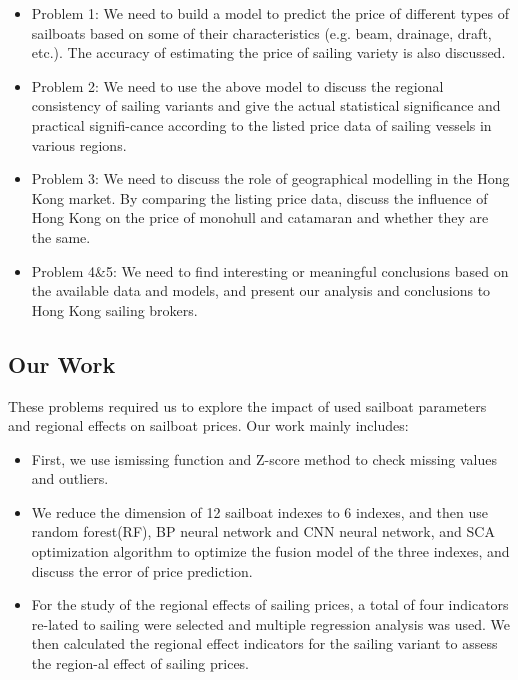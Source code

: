 \begin{itemize}
\setlength{\parsep}{0ex} %
\setlength{\topsep}{2ex} %
\setlength{\itemsep}{1ex} %
\item Problem 1: We need to build a model to predict the price of different types of sailboats based on some of their characteristics (e.g. beam, drainage, draft, etc.). The accuracy of estimating the price of sailing variety is also discussed.
\item Problem 2: We need to use the above model to discuss the regional consistency of sailing variants and give the actual statistical significance and practical signifi-cance according to the listed price data of sailing vessels in various regions.
\item Problem 3: We need to discuss the role of geographical modelling in the Hong Kong market. By comparing the listing price data, discuss the influence of Hong Kong on the price of monohull and catamaran and whether they are the same.
\item Problem 4\&5: We need to find interesting or meaningful conclusions based on the available data and models, and present our analysis and conclusions to Hong Kong sailing brokers.
\end{itemize}

\subsection{Our Work}
These problems required us to explore the impact of used sailboat parameters and regional effects on sailboat prices. Our work mainly includes:

\begin{itemize}
\setlength{\parsep}{0ex} %
\setlength{\topsep}{2ex} %
\setlength{\itemsep}{1ex} %
\item First, we use ismissing function and Z-score method to check missing values and outliers.
\item We reduce the dimension of 12 sailboat indexes to 6 indexes, and then use random forest(RF), BP neural network and CNN neural network, and SCA optimization algorithm to optimize the fusion model of the three indexes, and discuss the error of price prediction.
\item For the study of the regional effects of sailing prices, a total of four indicators re-lated to sailing were selected and multiple regression analysis was used. We then calculated the regional effect indicators for the sailing variant to assess the region-al effect of sailing prices.
\end{itemize}

